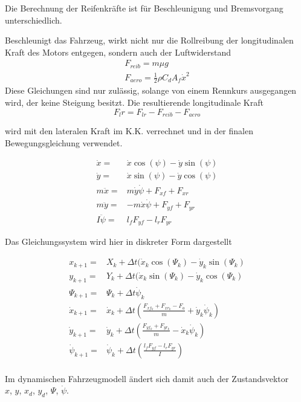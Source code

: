 \documentclass{like}
\begin{document}
Die Berechnung der Reifenkräfte ist für Beschleunigung und Bremsvorgang unterschiedlich.

Beschleunigt das Fahrzeug, wirkt nicht nur die Rollreibung der longitudinalen Kraft des Motors entgegen, sondern auch der Luftwiderstand
\begin{eqnarray}
F_{reib} = m \mu g \\
F_{aero} = \frac{1}{2} \rho C_d A_f \dot{x}^2
\end{eqnarray}
Diese Gleichungen sind nur zulässig, solange von einem Rennkurs ausgegangen wird, der keine Steigung besitzt. Die resultierende longitudinale Kraft 
\begin{equation}
F_lr = F_{lr} - F_{reib} - F_{aero}
\end{equation}

wird mit den lateralen Kraft im \ac{K.K.} verrechnet und in der finalen Bewegungsgleichung verwendet.

\begin{eqnarray}
\dot{x} =& \dot{x} \cos(\psi) - \dot{y} \sin(\psi) \\
\dot{y} =& \dot{x} \sin(\psi) - \dot{y} \cos(\psi) \\
m \ddot{x} =& m \dot{y} \dot{\psi} + F_{xf} +  F_{xr}\\
m \ddot{y} =& - m \dot{x} \dot{\psi} +  F_{yf} +  F_{yr} \\
I \ddot{\psi} =&  l_f F_{yf} -  l_r F_{yr} 
\end{eqnarray}

Das Gleichungssystem wird hier in diskreter Form dargestellt

\begin{eqnarray}
x_{k+1} =& X_k + \Delta t(\dot{x}_k \cos(\Psi_k) - \dot{y}_k \sin(\Psi_k) \\
y_{k+1} =& Y_{k} + \Delta t(\dot{x}_k \sin(\Psi_k) - \dot{y}_k \cos(\Psi_k) \\
\Psi_{k+1} =& \Psi_k + \Delta t \dot{\psi}_k \\
\dot{x}_{k+1} =&  \dot{x}_k + \Delta t \left(\frac{F_{xf_k} +  F_{xr_k}- F_a}{m} + \dot{y}_k \dot{\psi}_k \right) \\
\dot{y}_{k+1} =&  \dot{y}_k + \Delta t \left(\frac{ F_{yf_k} +  F_{yr_k}}{m} - \dot{x}_k \dot{\psi}_k \right)  \\
\dot{\psi}_{k+1} =& \dot{\psi}_k + \Delta t \left( \frac{ l_f F_{yf} -  l_r F_{yr}}{I}  \right)\\
\end{eqnarray}

Im dynamischen Fahrzeugmodell ändert sich damit auch der Zustandsvektor \\
\(x\), \(y\), \(x_d\), \(y_d\), \(\Psi\), \(\dot{\psi}\). \\
\end{document}
